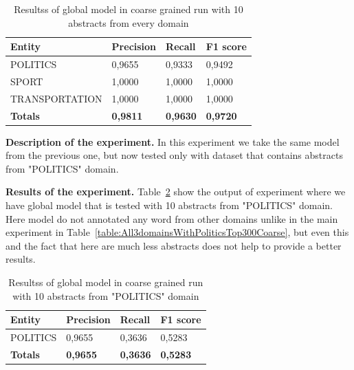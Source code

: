 \documentclass[thesis=M,english]{FITthesis}[2018/05/30]
\begin{document}
	\begin{table}[H]\centering
		\begin{tabular}{|l|l|l|l|}
			\hline {\textbf{Entity}} & {\textbf{Precision}} & {\textbf{Recall}} & {\textbf{F1 score}}\\\hline
				POLITICS & 0,9655 & 0,9333 & 0,9492\\
				SPORT & 1,0000 & 1,0000 & 1,0000\\
				TRANSPORTATION & 1,0000 & 1,0000 & 1,0000\\\hline
				\textbf{Totals} & \textbf{0,9811} & \textbf{0,9630} & \textbf{0,9720}\\\hline
		\end{tabular}
	\caption{Resultss of global model in coarse grained run with 10 abstracts from every domain \label{table:GlobalDomainWithAllAbstractsTop10Coarse}}
	\end{table}

	\textbf{Description of the experiment.} In this experiment we take the same model from the previous one, but now tested only with dataset that contains abstracts from "POLITICS" domain.
	
	\textbf{Results of the experiment.} Table~\ref{table:GlobalDomainWithPoliticsTop10Coarse} show the output of experiment where we have global model that is tested with 10 abstracts from "POLITICS" domain. Here model do not annotated any word from other domains unlike in the main experiment in Table~\ref{table:All3domainsWithPoliticsTop300Coarse}, but even this and the fact that here are much less abstracts does not help to provide a better results.
	
	\begin{table}[H]\centering
		\begin{tabular}{|l|l|l|l|}
			\hline {\textbf{Entity}} & {\textbf{Precision}} & {\textbf{Recall}} & {\textbf{F1 score}}\\\hline
				POLITICS & 0,9655 & 0,3636 & 0,5283\\\hline
				\textbf{Totals} & \textbf{0,9655} & \textbf{0,3636} & \textbf{0,5283}\\\hline
		\end{tabular}
		\caption{Resultss of global model in coarse grained run with 10 abstracts from "POLITICS" domain \label{table:GlobalDomainWithPoliticsTop10Coarse}}
	\end{table}
\end{document}
